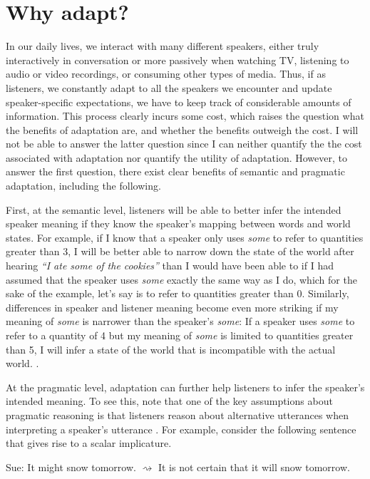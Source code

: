 \section{Why adapt?}

In our daily lives, we interact with many different speakers, either truly interactively in conversation or more passively when watching TV, listening to audio or video recordings, or consuming other types of media. Thus, if as listeners, we constantly adapt to all the speakers we encounter and update speaker-specific expectations, we have to keep track of considerable amounts of information. This process clearly incurs some cost, which raises the question what the benefits of adaptation are, and whether the benefits outweigh the cost. I will not be able to answer the latter question since I can neither quantify the 
the cost associated with adaptation nor quantify the utility of adaptation. However, to answer the first question, there exist clear benefits of semantic and pragmatic adaptation, including the following.

First, at the semantic level, listeners will be able to better infer the intended speaker meaning if they know the speaker's mapping between words and world states. For example, if I know that a speaker only uses \emph{some} to refer to quantities greater than 3, I will be better able to narrow down the state of the world after hearing \emph{``I ate some of the cookies''} than I would have been able to if I had assumed that the speaker uses \emph{some} exactly the same way as I do, which for the sake of the example, let's say is to refer to quantities greater than 0. Similarly, differences in speaker and listener meaning become even more striking if my meaning of \emph{some} is narrower than the speaker's \emph{some}: If a speaker uses \emph{some} to refer to a quantity of 4 but my meaning of \emph{some} is limited to quantities greater than 5, I will infer a state of the world that is incompatible with the actual world. .

At the pragmatic level, adaptation can further help listeners to infer the speaker's intended meaning. To see this, note that one of the key assumptions about pragmatic reasoning is that listeners reason about alternative utterances when interpreting a speaker's utterance \cite{Grice1975, Horn1984}. For example, consider the following sentence that gives rise to a scalar implicature.

\begin{exe}
\ex Sue: It might snow tomorrow.
\ex \label{ex:snow-inf} $\rightsquigarrow$  It is not certain that it will snow tomorrow.
\end{exe}

